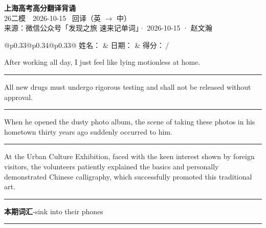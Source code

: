 \documentclass[11pt,a4paper]{article}
\newcommand{\num}[1]{\makebox[1.9em][r]{#1.}\hspace{0.3em}}
\newcommand{\wline}{\noindent\rule{\linewidth}{0.4pt}}
\begin{document}
\pagestyle{plain}
\begin{center}
{\LARGE\bfseries 上海高考高分翻译背诵 }\\[0.25em]
{\large 26二模　2026-10-15 \quad\ 回译（英 $\to$ 中）}\\[0.35em]
{\footnotesize 来源：微信公众号「发现之旅 速来记单词」· 2026-10-15 · 赵文瀚}
\end{center}

\vspace{0.4em}
\noindent\begin{tabular}{@{}p{0.33\textwidth}@{}p{0.34\textwidth}@{}p{0.33\textwidth}@{}}
姓名：\underline{\hspace{2.0cm}} & 日期：\underline{\hspace{2.0cm}} & 得分：\underline{\hspace{1.4cm}}\,/ \\
\end{tabular}

\vspace{0.5em}

\vspace{0.8em}
\num{1}After working all day, I just feel like lying motionless at home.

\vspace{0.25em}

\wline

\num{2}All new drugs must undergo rigorous testing and shall not be released without approval.

\vspace{0.25em}

\wline

\num{3}When he opened the dusty photo album, the scene of taking these photos in his hometown thirty years ago suddenly occurred to him.

\vspace{0.25em}

\wline

\num{4}At the Urban Culture Exhibition, faced with the keen interest shown by foreign visitors, the volunteers patiently explained the basics and personally demonstrated Chinese calligraphy, which successfully promoted this traditional art.

\vspace{0.25em}

\wline

\vspace{0.4em}\noindent{\color{rulegray}\rule{\textwidth}{0.6pt}}\vspace{0.4em}

\num{5}\textbf{本期词汇}\quad -sink into their phones

\vspace{0.25em}

\wline
\end{document}
